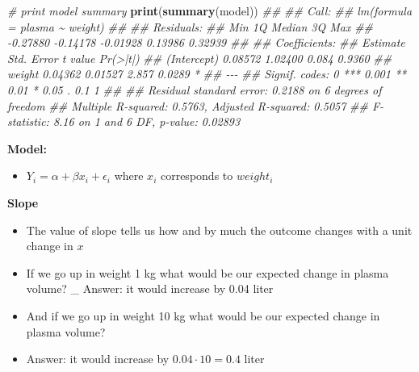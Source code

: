 \documentclass[
]{book}
\newenvironment{Shaded}{\begin{snugshade}}{\end{snugshade}}
\newcommand{\CommentTok}[1]{\textcolor[rgb]{0.56,0.35,0.01}{\textit{#1}}}
\newcommand{\KeywordTok}[1]{\textcolor[rgb]{0.13,0.29,0.53}{\textbf{#1}}}
\newcommand{\NormalTok}[1]{#1}
\providecommand{\tightlist}{%
  \setlength{\itemsep}{0pt}\setlength{\parskip}{0pt}}
\theoremstyle{definition}
\theoremstyle{definition}
\theoremstyle{definition}
\theoremstyle{remark}
\begin{document}
\begin{Shaded}
\begin{Highlighting}[]

\CommentTok{\# print model summary}
\KeywordTok{print}\NormalTok{(}\KeywordTok{summary}\NormalTok{(model))}
\CommentTok{\#\# }
\CommentTok{\#\# Call:}
\CommentTok{\#\# lm(formula = plasma \textasciitilde{} weight)}
\CommentTok{\#\# }
\CommentTok{\#\# Residuals:}
\CommentTok{\#\#      Min       1Q   Median       3Q      Max }
\CommentTok{\#\# {-}0.27880 {-}0.14178 {-}0.01928  0.13986  0.32939 }
\CommentTok{\#\# }
\CommentTok{\#\# Coefficients:}
\CommentTok{\#\#             Estimate Std. Error t value Pr(\textgreater{}|t|)  }
\CommentTok{\#\# (Intercept)  0.08572    1.02400   0.084   0.9360  }
\CommentTok{\#\# weight       0.04362    0.01527   2.857   0.0289 *}
\CommentTok{\#\# {-}{-}{-}}
\CommentTok{\#\# Signif. codes:  0 \textquotesingle{}***\textquotesingle{} 0.001 \textquotesingle{}**\textquotesingle{} 0.01 \textquotesingle{}*\textquotesingle{} 0.05 \textquotesingle{}.\textquotesingle{} 0.1 \textquotesingle{} \textquotesingle{} 1}
\CommentTok{\#\# }
\CommentTok{\#\# Residual standard error: 0.2188 on 6 degrees of freedom}
\CommentTok{\#\# Multiple R{-}squared:  0.5763,	Adjusted R{-}squared:  0.5057 }
\CommentTok{\#\# F{-}statistic:  8.16 on 1 and 6 DF,  p{-}value: 0.02893}
\end{Highlighting}
\end{Shaded}

\textbf{Model:}

\begin{itemize}
\tightlist
\item
  \(Y_i = \alpha + \beta x_i + \epsilon_i\) where \(x_i\) corresponds to \(weight_i\)
\end{itemize}

\textbf{Slope}

\begin{itemize}
\tightlist
\item
  The value of slope tells us how and by much the outcome changes with a unit change in \(x\)
\item
  If we go up in weight 1 kg what would be our expected change in plasma volume?
  \_ Answer: it would increase by 0.04 liter
\item
  And if we go up in weight 10 kg what would be our expected change in plasma volume?
\item
  Answer: it would increase by \(0.04 \cdot 10 = 0.4\) liter
\end{itemize}
\end{document}
